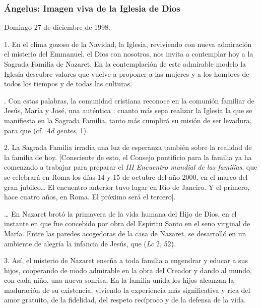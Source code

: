 \subsubsection{Ángelus: Imagen viva de la Iglesia de Dios}

Domingo 27 de diciembre de 1998.

1. En el clima gozoso de la Navidad, la Iglesia, reviviendo con nueva admiración el misterio del Emmanuel, el Dios con nosotros, nos invita a contemplar hoy a la Sagrada Familia de Nazaret. En la contemplación de este admirable modelo la Iglesia descubre valores que vuelve a proponer a las mujeres y a los hombres de todos los tiempos y de todas las culturas.

. Con estas palabras, la comunidad cristiana reconoce en la comunión familiar de Jesús, María y José, una auténtica : cuanto más sepa realizar la Iglesia la  que se manifiesta en la Sagrada Familia, tanto más cumplirá su misión de ser levadura, para que  (cf. \emph{Ad gentes}, 1).

2. La Sagrada Familia irradia una luz de esperanza también sobre la realidad de la familia de hoy. {[}Consciente de esto, el Consejo pontificio para la familia ya ha comenzado a trabajar para preparar el \emph{III Encuentro mundial de las familias}, que se celebrará en Roma los días 14 y 15 de octubre del año 2000, en el marco del gran jubileo\ldots{} El encuentro anterior tuvo lugar en Río de Janeiro. Y el primero, hace cuatro años, en Roma. El próximo será el tercero{]}.

\ldots{} En Nazaret brotó la primavera de la vida humana del Hijo de Dios, en el instante en que fue concebido por obra del Espíritu Santo en el seno virginal de María. Entre las paredes acogedoras de la casa de Nazaret, se desarrolló en un ambiente de alegría la infancia de Jesús, que  (\emph{Lc} 2, 52).

3. Así, el misterio de Nazaret enseña a toda familia a engendrar y educar a sus hijos, cooperando de modo admirable en la obra del Creador y dando al mundo, con cada niño, una nueva sonrisa. En la familia unida los hijos alcanzan la maduración de su existencia, viviendo la experiencia más significativa y rica del amor gratuito, de la fidelidad, del respeto recíproco y de la defensa de la vida.

